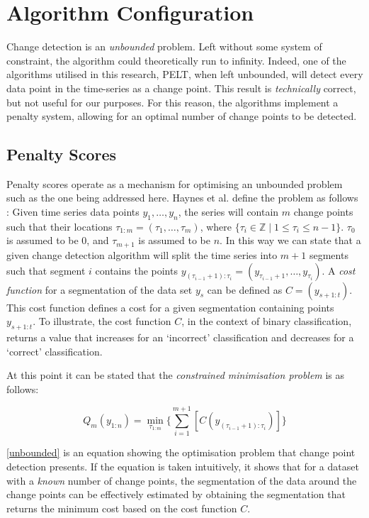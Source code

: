\documentclass{uvamscse}	%
\begin{document}
\section{Algorithm Configuration}

Change detection is an \emph{unbounded} problem. Left without some system of constraint, the algorithm could theoretically run to infinity. Indeed, one of the algorithms utilised in this research, PELT, when left unbounded, will detect every data point in the time-series as a change point. This result is \textit{technically} correct, but not useful for our purposes. For this reason, the algorithms implement a penalty system, allowing for an optimal number of change points to be detected.

\subsection{Penalty Scores}

Penalty scores operate as a mechanism for optimising an unbounded problem such as the one being addressed here. Haynes et al. define the problem as follows \cite{Haynes2014}: Given time series data points $y_1,\ldots,y_n$, the series will contain $m$ change points such that their locations $\tau_{1:m} = (\tau_1,\ldots,\tau_m)$, where $\{\tau_i \in \mathbb{Z} \mid 1 \leqslant \tau_i \leqslant n-1\}$. $\tau_0$ is assumed to be 0, and $\tau_{m+1}$ is assumed to be $n$. In this way we can state that a given change detection algorithm will split the time series into $m + 1$ segments such that segment $i$ contains the points $y_{(\tau_{i-1}+1):\tau_i} = (y_{\tau_{i-1} + 1},\dots,y_{\tau_i})$. A \emph{cost function} for a segmentation of the data set $y_s$ can be defined as $C = (y_{s+1:t})$. This cost function defines a cost for a given segmentation containing points $y_{s+1:t}$. To illustrate, the cost function $C$, in the context of binary classification, returns a value that increases for an `incorrect' classification and decreases for a `correct' classification.

At this point it can be stated that the \emph{constrained minimisation problem} is as follows:

\begin{equation}
\label{unbounded}
    Q_m(y_{1:n}) = \min_{\tau_{1:m}} \Bigg\{ \sum^{m+1}_{i=1}[C(y_{(\tau_{i - 1} + 1):\tau_i})] \Bigg\}
\end{equation}

\autoref{unbounded} is an equation showing the optimisation problem that change point detection presents. If the equation is taken intuitively, it shows that for a dataset with a \emph{known} number of change points, the segmentation of the data around the change points can be effectively estimated by obtaining the segmentation that returns the minimum cost based on the cost function $C$.
\end{document}
